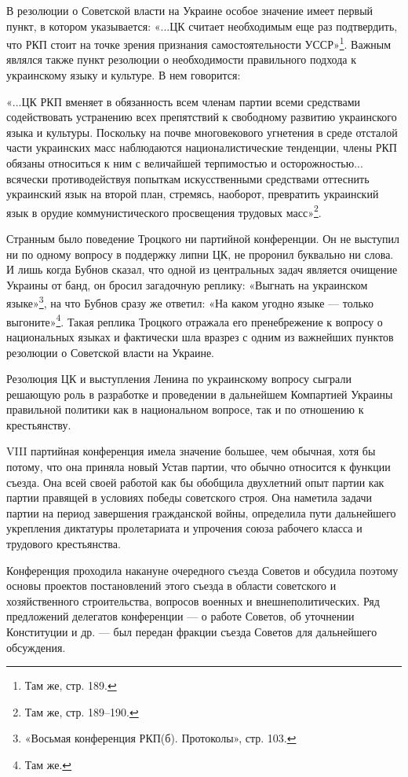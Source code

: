 \documentclass[12pt, a4paper, openany]{book}
\begin{document}
В резолюции о Советской власти на Украине особое значение имеет первый пункт, в котором указывается: «...ЦК считает необходимым еще раз подтвердить, что РКП стоит на точке зрения признания самостоятельности УССР»\footnote{Там же, стр. 189.}. Важным являлся также пункт резолюции о необходимости правильного подхода к украинскому языку и культуре. В нем говорится:

«...ЦК РКП вменяет в обязанность всем членам партии всеми средствами содействовать устранению всех препятствий к свободному развитию украинского языка и культуры. Поскольку на почве многовекового угнетения в среде отсталой части украинских масс наблюдаются националистические тенденции, члены РКП обязаны относиться к ним с величайшей терпимостью и осторожностью... всячески противодействуя попыткам искусственными средствами оттеснить украинский язык на второй план, стремясь, наоборот, превратить украинский язык в орудие коммунистического просвещения трудовых масс»\footnote{Там же, стр. 189–190.}.

Странным было поведение Троцкого ни партийной конференции. Он не выступил ни по одному вопросу в поддержку липни ЦК, не проронил буквально ни слова. И лишь когда Бубнов сказал, что одной из центральных задач является очищение Украины от банд, он бросил загадочную реплику: «Выгнать на украинском языке»\footnote{«Восьмая конференция РКП(б). Протоколы», стр. 103.}, на что Бубнов сразу же ответил: «На каком угодно языке — только выгоните»\footnote{Там же.}. Такая реплика Троцкого отражала его пренебрежение к вопросу о национальных языках и фактически шла вразрез с одним из важнейших пунктов резолюции о Советской власти на Украине.

Резолюция ЦК и выступления Ленина по украинскому вопросу сыграли решающую роль в разработке и проведении в дальнейшем Компартией Украины правильной политики как в национальном вопросе, так и по отношению к крестьянству.

VIII партийная конференция имела значение большее, чем обычная, хотя бы потому, что она приняла новый Устав партии, что обычно относится к функции съезда. Она всей своей работой как бы обобщила двухлетний опыт партии как партии правящей в условиях победы советского строя. Она наметила задачи партии на период завершения гражданской войны, определила пути дальнейшего укрепления диктатуры пролетариата и упрочения союза рабочего класса и трудового крестьянства.

Конференция проходила накануне очередного съезда Советов и обсудила поэтому основы проектов постановлений этого съезда в области советского и хозяйственного строительства, вопросов военных и внешнеполитических. Ряд предложений делегатов конференции — о работе Советов, об уточнении Конституции и др. — был передан фракции съезда Советов для дальнейшего обсуждения.
\end{document}
